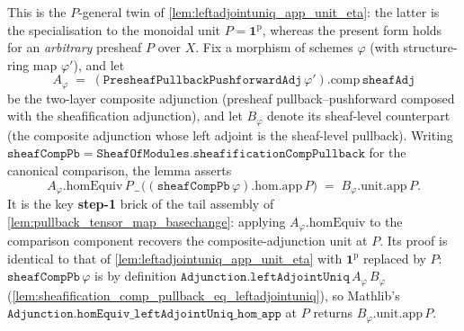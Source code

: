 \begin{lemma}
  \label{lem:leftadjointuniq_app_unit_eta_general}
  This is the \(P\)-general twin of \cref{lem:leftadjointuniq_app_unit_eta}: the latter is the
  specialisation to the monoidal unit \(P = \mathbf{1}^{\mathrm{p}}\), whereas the present form
  holds for an \emph{arbitrary} presheaf \(P\) over \(X\). Fix a morphism of schemes
  \(\varphi\) (with structure-ring map \(\varphi'\)), and let
  \[
    A_{\varphi}
      \;=\;
    (\mathtt{PresheafPullbackPushforwardAdj}\,\varphi').\mathrm{comp}\,\mathtt{sheafAdj}
  \]
  be the two-layer composite adjunction (presheaf pullback--pushforward composed with the
  sheafification adjunction), and let \(B_{\varphi}\) denote its sheaf-level counterpart (the
  composite adjunction whose left adjoint is the sheaf-level pullback). Writing
  \(\mathtt{sheafCompPb} = \mathtt{SheafOfModules.sheafificationCompPullback}\) for the
  canonical comparison, the lemma asserts
  \[
    A_{\varphi}.\mathrm{homEquiv}\,P\,\_\,\bigl((\mathtt{sheafCompPb}\,\varphi).\mathrm{hom}.\mathrm{app}\,P\bigr)
      \;=\;
    B_{\varphi}.\mathrm{unit}.\mathrm{app}\,P.
  \]
  It is the key \textbf{step-1} brick of the tail assembly of
  \cref{lem:pullback_tensor_map_basechange}: applying \(A_{\varphi}.\mathrm{homEquiv}\) to the
  comparison component recovers the composite-adjunction unit at \(P\). Its proof is identical
  to that of \cref{lem:leftadjointuniq_app_unit_eta} with \(\mathbf{1}^{\mathrm{p}}\) replaced
  by \(P\): \(\mathtt{sheafCompPb}\,\varphi\) is by definition
  \(\mathtt{Adjunction.leftAdjointUniq}\,A_{\varphi}\,B_{\varphi}\)
  (\cref{lem:sheafification_comp_pullback_eq_leftadjointuniq}), so Mathlib's
  \(\mathtt{Adjunction.homEquiv\_leftAdjointUniq\_hom\_app}\) at \(P\) returns
  \(B_{\varphi}.\mathrm{unit}.\mathrm{app}\,P\).
\end{lemma}

